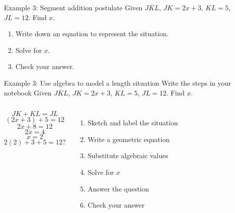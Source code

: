 \begin{frame}{Example 3: Segment addition postulate}
  Given $\overline{JKL}$, $JK=2x+3$, $KL=5$, $JL=12$. Find ${x}$.
  \begin{center}
  \end{center}
  \begin{enumerate}
    \item Write down an equation to represent the situation. \vspace{1cm}
    \item Solve for $x$. \vspace{1cm}
    \item Check your answer.
  \end{enumerate} \vspace{1cm}
\end{frame}

\begin{frame}{Example 3: Use algebra to model a length situation}
  {Write the steps in your notebook}
  Given $\overline{JKL}$, $JK=2x+3$, $KL=5$, $JL=12$. Find ${x}$.
  \begin{center}
  \end{center}
\begin{columns}[]{}
    \[JK+KL=JL\]
    \[(2x+3)+5=12\]
    \[2x+8=12\]
    \[2x=4\]
    \[x=2\]
    \[2(2)+3+5=12?\]
    \begin{enumerate}
        \item Sketch and label the situation
        \item Write a geometric equation
        \item Substitute algebraic values
        \item Solve for $x$
        \item Answer the question
        \item Check your answer
    \end{enumerate}
  \end{columns}
\end{frame}

